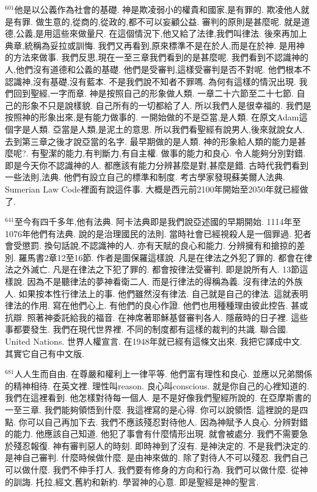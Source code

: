 \documentclass{book}
\begin{document}
$^{601}$他是以公義作為社會的基礎.
神是欺凌弱小的權貴和國家,是有罪的.
欺凌他人就是有罪.
做生意的,從商的,從政的,都不可以妄顧公益.
審判的原則是甚麼呢.
就是道德,公義,是用這些來做量尺.
在這個情況下,他又給了法律,我們叫律法.
後來再加上典章,統稱為妥拉或訓悔.
我們又再看到,原來標準不是在於人,而是在於神.
是用神的方法來做事.
我們反思,現在一至三章我們看到的是甚麼呢.
我們看到不認識神的人,他們沒有道德和公義的基礎.
他們是受審判,這樣受審判是否不對呢.
他們根本不認識神,沒有基礎,沒有藍本.
不是我們說不知者不罪嗎.
為何有這樣的情況出現.
我們回到聖經,一字而章.
神是按照自己的形象做人類.
一章二十六節至二十七節.
自己的形象不只是說樣貌.
自己所有的一切都給了人.
所以我們人是很幸福的.
我們是按照神的形象出來,是有能力做事的.
一開始做的不是亞當,是人類.
在原文Adam這個字是人類.
亞當是人類,是泥土的意思.
所以我們看聖經有說男人,後來就說女人.
去到第三章之後才說亞當的名字.
最早期做的是人類.
神的形象給人類的能力是甚麼呢?.
有聖潔的能力,有判斷力,有自主權.
做事的能力和良心.
令人能夠分別對錯.
即是今天你不認識神的人.
都應該有能力分辨甚麼是對,甚麼是錯.
古時代我們看到一些法則,法典.
他們有設立自己的標準和制度.
考古學家發現蘇美爾人法典.
Sumerian Law Code裡面有說這件事.
大概是西元前2100年開始至2050年就已經做了.

$^{641}$至今有四千多年,他有法典.
阿卡法典即是我們說亞述國的早期開始.
1114年至1076年他們有法典.
說的是治理國民的法則.
當時社會已經視殺人是一個罪過.
犯者會受懲罰.
換句話說,不認識神的人.
亦有天賦的良心和能力.
分辨擁有和搶掠的差別.
羅馬書2章12至16節.
作者是圖保羅這樣說.
凡是在律法之外犯了罪的.
都會在律法之外滅亡.
凡是在律法之下犯了罪的.
都會按律法受審判.
即是說所有人.
13節這樣說.
因為不是聽律法的夢神看衛二人.
而是行律法的得稱為義.
沒有律法的外族人.
如果按本性行律法上的事.
他們雖然沒有律法.
自己就是自己的律法.
這就表明律法的作用.
寫在他們心上.
有他們的良心作證.
他們也用種種理由彼此控告.
甚或抗辯.
照著神委託給我的福音.
在神席著耶穌基督審判各人.
隱蔽時的日子裡.
這些事都要發生.
我們在現代世界裡.
不同的制度都有這樣的裁判的共識.
聯合國.
United Nations.
世界人權宣言.
在1948年就已經有這條文出來.
我把它譯成中文.
其實它自己有中文版.

$^{681}$人人生而自由.
在尊嚴和權利上一律平等.
他們富有理性和良心.
並應以兄弟關係的精神相待.
在英文裡.
理性叫reason.
良心叫conscious.
就是你自己的心裡知道的.
我們在這裡看到.
他怎樣對待每一個人.
是不是好像我們聖經所說的.
在亞摩斯書的一至三章.
我們能夠領悟到什麼.
我這裡寫的是心得.
你可以說領悟.
這裡說的是四點.
你可以自己再加下去.
我們不應該殘忍對待他人.
因為神賦予人良心.
分辨對錯的能力.
他應該自己知道.
他犯了事會有什麼情形出現.
就會被處分.
我們不需要急於殘忍報復.
神有審判惡人的時刻.
即時神到了沒有.
是神決定的.
不是我們決定的.
是神自己審判.
什麼時候做什麼.
是由神來做的.
除了對待人不可以殘忍.
我們自己可以做什麼.
我們不伸手打人.
我們要有修身的方向和行為.
我們可以做什麼.
從神的訓誨.
托拉,經文,舊約和新約.
學習神的心意.
即是聖經是神的聖言.
\end{document}
